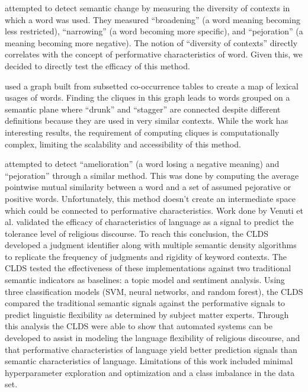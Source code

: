 \documentclass[11pt]{article}
\begin{document}
 attempted to detect semantic change by measuring the diversity of contexts in which a word was used. They measured “broadening” (a word meaning becoming less restricted), “narrowing” (a word becoming more specific), and “pejoration” (a meaning becoming more negative). The notion of “diversity of contexts” directly correlates with the concept of performative characteristics of word. Given this, we decided to directly test the efficacy of this method. 

 used a graph built from subsetted co-occurrence tables to create a map of lexical usages of words. Finding the cliques in this graph leads to words grouped on a semantic plane where “drunk” and “stagger” are connected despite different definitions because they are used in very similar contexts. While the work has interesting results, the requirement of computing cliques is computationally complex, limiting the scalability and accessibility of this method.

 attempted to detect “amelioration” (a word losing a negative meaning) and “pejoration” through a similar method. This was done by computing the average pointwise mutual similarity between a word and a set of assumed pejorative or positive words. Unfortunately, this method doesn’t create an intermediate space which could be connected to performative characteristics.
Work done by Venuti et al. validated the efficacy of characteristics of language as a signal to predict the tolerance level of religious discourse. To reach this conclusion, the CLDS developed a judgment identifier along with multiple semantic density algorithms to replicate the frequency of judgments and rigidity of keyword contexts. The CLDS tested the effectiveness of these implementations against two traditional semantic indicators as baselines: a topic model and sentiment analysis. Using three classification models (SVM, neural networks, and random forest), the CLDS compared the traditional semantic signals against the performative signals to predict linguistic flexibility as determined by subject matter experts. Through this analysis the CLDS were able to show that automated systems can be developed to assist in modeling the language flexibility of religious discourse, and that performative characteristics of language yield better prediction signals than semantic characteristics of language. Limitations of this work included minimal hyperparameter exploration and optimization and a class imbalance in the data set. 
\end{document}
